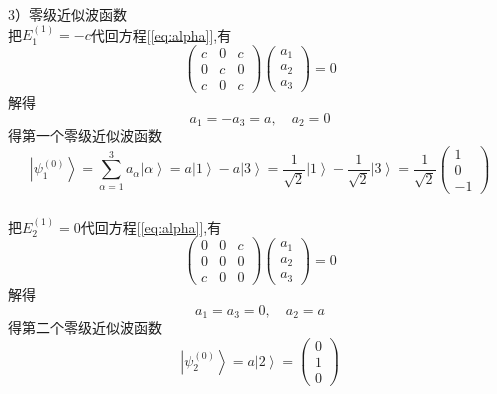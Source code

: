 \begin{frame}
  \frametitle{}
3）零级近似波函数 \\
把$E_{1}^{(1)} = -c$代回方程[\ref{eq:alpha}],有 
\begin{equation*}
  \begin{pmatrix}
    c & 0 & c \\
    0 & c & 0 \\
    c & 0 & c \end{pmatrix}
    \begin{pmatrix}a_{1} \\a_{2} \\ a_{3 } \end{pmatrix} =0
\end{equation*}
解得 
\[ a_{1} = - a_{3} =a, \quad a_{2} =0 \]
得第一个零级近似波函数
$$\left\vert \psi ^{(0)}_{1} \right\rangle = \sum_{\alpha=1}^3 a_\alpha \left\vert \alpha \right\rangle  = a \left\vert 1 \right\rangle -a \left\vert 3 \right\rangle = \frac{1}{\sqrt{2}} \left\vert 1 \right\rangle - \frac{1}{\sqrt{2}} \left\vert 3 \right\rangle = \frac{1}{\sqrt{2}} \begin{pmatrix}
  1 \\
  0  \\
  -1 \end{pmatrix}$$
\end{frame} 

\begin{frame}
  \frametitle{}
  把$E_{2}^{(1)} = 0 $代回方程[\ref{eq:alpha}],有 
  \begin{equation*}
    \begin{pmatrix}
      0 & 0 & c \\
      0 & 0 & 0 \\
      c & 0 & 0 \end{pmatrix}
      \begin{pmatrix}a_{1} \\a_{2} \\ a_{3 } \end{pmatrix} =0
  \end{equation*}
  解得 
  \[ a_{1} =  a_{3} =0, \quad a_{2} =a \]
  得第二个零级近似波函数
  $$\left\vert \psi ^{(0)}_{2} \right\rangle = a\left\vert 2 \right\rangle = \begin{pmatrix}
    0 \\
    1  \\
    0 \end{pmatrix} $$
\end{frame} 

